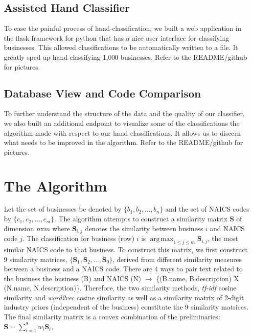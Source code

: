 \documentclass[letterpaper, 9 pt, conference]{IEEEtran}
\DeclareMathOperator*{\argmax}{arg\,max}
\newcommand{\matr}[1]{\mathbf{#1}}
\begin{document}
\subsection{Assisted Hand Classifier}

To ease the painful process of hand-classification, we built a web application in the flask framework for python that has a nice user interface for classifying businesses. This allowed classifications to be automatically written to a file. It greatly sped up hand-classifying 1,000 businesses. Refer to the README/github for pictures.

\subsection{Database View and Code Comparison}

To further understand the structure of the data and the quality of our classifier, we also built an additional endpoint to visualize some of the classifications the algorithm made with respect to our hand classifications. It allows us to discern what needs to be improved in the algorithm. Refer to the README/github for pictures.

\section{The Algorithm}

Let the set of businesses be denoted by $\{b_1,b_2,\dots,b_n\}$ and the set of NAICS codes by $\{c_1,c_2,\dots,c_m\}$. The algorithm attempts to construct a similarity matrix $\matr{S}$ of dimension $n$x$m$ where $\matr{S}_{i,j}$ denotes the similarity between business $i$ and NAICS code $j$. The classification for business (row) $i$ is $\argmax_{1 \leq j \leq m} \matr{S}_{i,j}$, the most similar NAICS code to that business. To construct this matrix, we first construct 9 similarity matrices, $\{\matr{S}_1,\matr{S}_2,\dots,\matr{S}_9\}$, derived from different similarity measures between a business and a NAICS code. There are 4 ways to pair text related to the business the business (B) and NAICS (N) $\rightarrow$ \{(B.name, B.description) X (N.name, N.description)\}. Therefore, the two similarity methods, \textit{tf-idf} cosine similarity \cite{tfidf} and \textit{word2vec} cosine similarity \cite{neural} as well as a similarity matrix of 2-digit industry priors (independent of the business) constitute the 9 similarity matrices. The final similarity matrix is a convex combination of the preliminaries: $ \matr{S} = \sum_{i=1}^9 w_i \matr{S}_i, $
\end{document}
